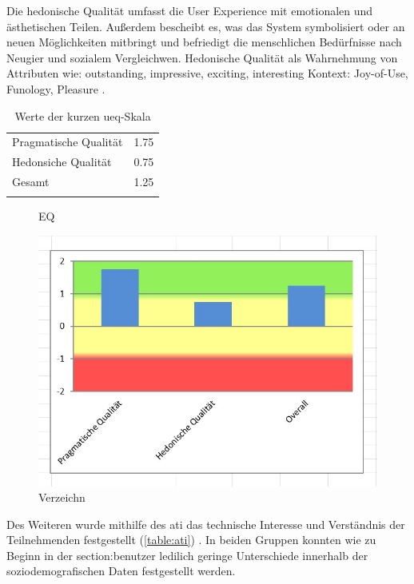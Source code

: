 Die hedonische Qualität umfasst die User Experience mit emotionalen und
ästhetischen Teilen. Außerdem bescheibt es, was das System symbolisiert oder an
neuen Möglichkeiten mitbringt und befriedigt die menschlichen Bedürfnisse nach
Neugier und sozialem Vergleichwen. Hedonische Qualität als Wahrnehmung von
Attributen wie: outstanding, impressive, exciting, interesting Kontext:
Joy-of-Use, Funology, Pleasure \cite{hassenzahl_thing_2004}. 

\begin{table}[h]
  \centering
  \caption{Werte der kurzen \ac{ueq}-Skala}
  \begin{tabular}{lc}
    \arrayrulecolor{maincolor}\hline
    Pragmatische Qualität & 1.75 \\
    Hedonsiche Qualität   & 0.75 \\
    Gesamt                & 1.25 \\
    \arrayrulecolor{maincolor}\hline
  \end{tabular}
  \label{table:ueq}
\end{table}

\begin{figure}[h]
  \centering
  \caption{EQ}
  \includegraphics[scale=0.7]{Bilder/Screenshot 2022-10-26 165800.jpg}
  \caption[UEQ]{Verzeichn}
  \label{fig:ueq}
\end{figure}

Des Weiteren wurde mithilfe des \ac{ati} das technische Interesse und
Verständnis der Teilnehmenden festgestellt (\ref{table:ati})
\cite{attig_assessing_2017}. In beiden Gruppen konnten wie zu Beginn in der
\refname{section:benutzer} ledilich geringe Unterschiede innerhalb der
soziodemografischen Daten festgestellt werden.

